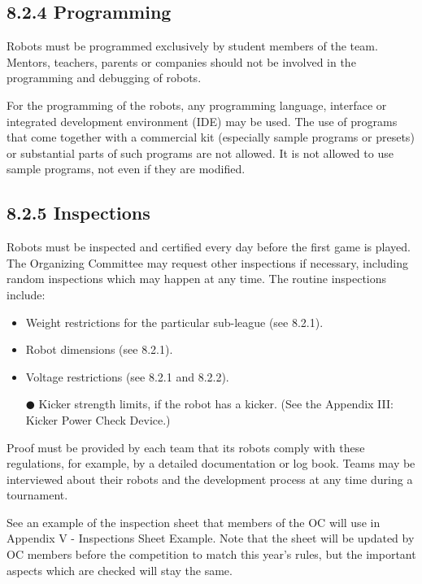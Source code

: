 \documentclass{article}
\begin{document}
\subsection{8.2.4 Programming \label{ref-058}}

Robots must be programmed exclusively by student members of the team. Mentors, teachers, parents or companies should not be involved in the programming and debugging of robots.

For the programming of the robots, any programming language, interface or integrated development environment (IDE) may be used. The use of programs that come together with a commercial kit (especially sample programs or presets) or substantial parts of such programs are not allowed. It is not allowed to use sample programs, not even if they are modified.

\subsection{8.2.5 Inspections \label{ref-059}}

Robots must be inspected and certified every day before the first game is played. The Organizing Committee may request other inspections if necessary, including random inspections which may happen at any time. The routine inspections include:

\begin{itemize}
\item Weight restrictions for the particular sub-league (see 8.2.1).

\item Robot dimensions (see 8.2.1).

\item Voltage restrictions (see 8.2.1 and 8.2.2).

${\CIRCLE}$ Kicker strength limits, if the robot has a kicker. (See the Appendix III: Kicker Power Check Device.)

\end{itemize}
Proof must be provided by each team that its robots comply with these regulations, for example, by a detailed documentation or log book. Teams may be interviewed about their robots and the development process at any time during a tournament.

See an example of the inspection sheet that members of the OC will use in Appendix V - Inspections Sheet Example. Note that the sheet will be updated by OC members before the competition to match this year's rules, but the important aspects which are checked will stay the same.
\end{document}
